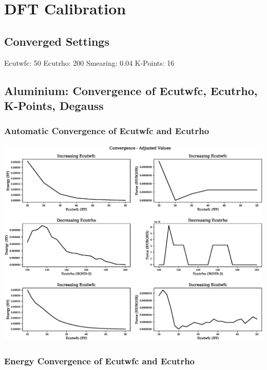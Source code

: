 \chapter{DFT Calibration}


\FloatBarrier
\section{Converged Settings}

Ecutwfc: 50
Ecutrho: 200
Smearing: 0.04
K-Points: 16

\FloatBarrier
\section{Aluminium: Convergence of Ecutwfc, Ecutrho, K-Points, Degauss}

\FloatBarrier
\subsection{Automatic Convergence of Ecutwfc and Ecutrho}

\begin{center}
\includegraphics[scale=0.35]{appendix/dft_calibration/al/ecut_convergence_adjusted_ry}
\end{center}



\FloatBarrier
\subsection{Energy Convergence of Ecutwfc and Ecutrho}

